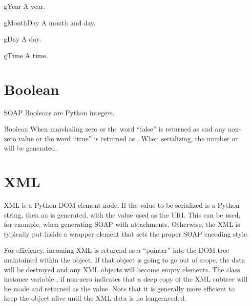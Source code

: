 \begin{classdesc}{gYear}{}
A year.
\end{classdesc}

\begin{classdesc}{gMonthDay}{}
A month and day.
\end{classdesc}

\begin{classdesc}{gDay}{}
A day.
\end{classdesc}

\begin{classdesc}{gTime}{}
A time.
\end{classdesc}

\section{Boolean}

SOAP Booleans are Python integers.

\begin{classdesc}{Boolean}{}
When marshaling zero or the word ``false'' is returned as 
and any non-zero value or the word ``true'' is returned as .
When serializing, the number  or  will be generated.
\end{classdesc}

\section{XML}

XML is a Python DOM element node.
If the value to be serialized is a Python string, then an 
is generated, with the value used as the URI.
This can be used, for example, when generating SOAP with attachments.
Otherwise, the XML is typically put inside a wrapper element that sets
the proper SOAP encoding style.

For efficiency, incoming XML is returend as a ``pointer'' into the
DOM tree maintained within the  object.
If that object is going to go out of scope, the data will be destroyed
and any XML objects will become empty elements.
The class instance variable , if non-zero indicates that a
deep copy of the XML subtree will be made and returned as the value.
Note that it is generally more efficient to keep the 
object alive until the XML data is no longerneeded.

